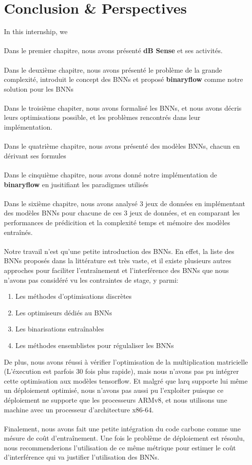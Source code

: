\chapter*{Conclusion \& Perspectives}

In this internship, we  \\
\\
Dans le premier chapitre, nous avons présenté \textbf{dB Sense} et ses activités. \\
\\
Dans le deuxième chapitre, nous avons présenté le problème de la grande complexité, introduit le concept des BNNs et proposé \textbf{binaryflow} comme notre solution pour les BNNs\\
\\
Dans le troisième chapiter, nous avons formalisé les BNNs, et nous avons décris leurs optimisations possible, et les problèmes rencontrés dans leur implémentation.\\
\\
Dans le quatrième chapitre, nous avons présenté des modèles BNNs, chacun en dérivant ses formules\\
\\
Dans le cinquième chapitre, nous avons donné notre implémentation de \textbf{binaryflow} en jusitifiant les paradigmes utilisés\\
\\
Dans le sixième chapitre, nous avons analysé 3 jeux de données en implémentant des modèles BNNs pour chacune de ces 3 jeux de données, et en comparant les performances de prédicition et la complexité temps et mémoire des modèles entraînés.\\
\\
Notre travail n'est qu'une petite introduction des BNNs. En effet, la liste des BNNs proposés dans la littérature est très vaste, et il existe plusieurs autres approches pour faciliter l'entraînement et l'interférence des BNNs que nous n'avons pas considéré vu les contraintes de stage, y parmi:
\begin{enumerate}
	\item Les méthodes d'optimisations discrètes
	\item Les optimiseurs dédiés au BNNs
	\item Les binarisations entraînables
	\item Les méthodes ensemblistes pour régulaliser les BNNs
\end{enumerate} 
De plus, nous avons réussi à vérifier l'optimisation de la multiplication matricielle (L'éxecution est parfois 30 fois plus rapide), mais nous n'avons pas pu intégrer cette optimisation aux modèles tensorflow. Et malgré que larq supporte lui même un déploiement optimisé, nous n'avons pas aussi pu l'exploiter puisque ce déploiement ne supporte que les processeurs ARMv8, et nous utilisons une machine avec un processeur d'architecture x86-64.\\
\\
Finalement, nous avons fait une petite intégration du code carbone comme une mésure de coût d'entraînement. Une fois le problème de déploiement est résoulu, nous recommenderions l'utilisation de ce même métrique pour estimer le coût d'interférence qui va justifier l'utilisation des BNNs.   